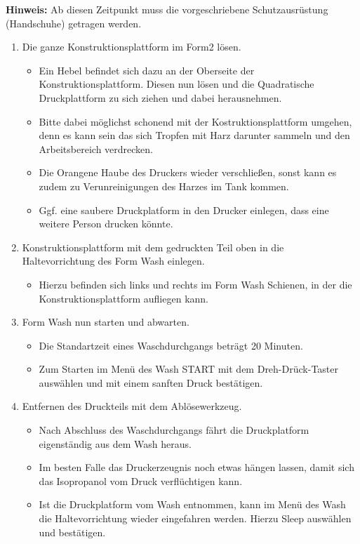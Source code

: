 \documentclass{\basedir/fablab-document}
\begin{document}
\textbf{Hinweis:} Ab diesen Zeitpunkt muss die vorgeschriebene Schutzausrüstung (Handschuhe) getragen werden.

\begin{enumerate}
    \item Die ganze Konstruktionsplattform im Form2 lösen.
        \begin{itemize}
            \item Ein Hebel befindet sich dazu an der Oberseite der Konstruktionsplattform. Diesen nun lösen und die Quadratische Druckplattform zu sich ziehen und dabei herausnehmen.
	    \item Bitte dabei möglichst schonend mit der Kostruktionsplattform umgehen, denn es kann sein das sich Tropfen mit Harz darunter sammeln und den Arbeitsbereich verdrecken.
            \item Die Orangene Haube des Druckers wieder verschließen, sonst kann es zudem zu Verunreinigungen des Harzes im Tank kommen.
	    \item Ggf. eine saubere Druckplatform in den Drucker einlegen, dass eine weitere Person drucken könnte.
        \end{itemize}
    \item Konstruktionsplattform mit dem gedruckten Teil oben in die Haltevorrichtung des Form Wash einlegen. 
    	 \begin{itemize}
    		\item Hierzu befinden sich links und rechts im Form Wash Schienen, in der die Konstruktionsplattform aufliegen kann. 
    	\end{itemize}
    \item Form Wash nun starten und abwarten.
    \begin{itemize}
    	\item Die Standartzeit eines Waschdurchgangs beträgt 20 Minuten.
    	\item Zum Starten im Menü des Wash START mit dem Dreh-Drück-Taster auswählen und mit einem sanften Druck bestätigen.
    \end{itemize}
    \item Entfernen des Druckteils mit dem Ablösewerkzeug.
        \begin{itemize}
        	\item Nach Abschluss des Waschdurchgangs fährt die Druckplatform eigenständig aus dem Wash heraus.
        	\item Im besten Falle das Druckerzeugnis noch etwas hängen lassen, damit sich das Isopropanol vom Druck verflüchtigen kann.
        	\item Ist die Druckplatform vom Wash entnommen, kann im Menü des Wash die Haltevorrichtung wieder eingefahren werden. Hierzu Sleep auswählen und bestätigen. 

\end{itemize}
\end{enumerate}
\end{document}
